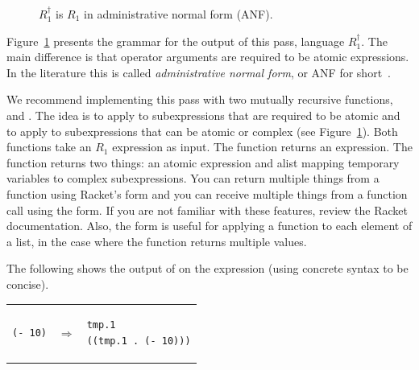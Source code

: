 \documentclass[11pt]{book}
\begin{document}
\begin{figure}[tp]
\centering
{}
\caption{$R_1^{\dagger}$ is $R_1$ in administrative normal form (ANF).}
\label{fig:r1-anf-syntax}
\end{figure}

Figure~\ref{fig:r1-anf-syntax} presents the grammar for the output of
this pass, language $R_1^{\dagger}$. The main difference is that
operator arguments are required to be atomic expressions.  In the
literature this is called \emph{administrative normal form}, or ANF
for short~\citep{Danvy:1991fk,Flanagan:1993cg}.

We recommend implementing this pass with two mutually recursive
functions,  and . The idea is to apply
 to subexpressions that are required to be atomic and
to apply  to subexpressions that can be atomic or
complex (see Figure~\ref{fig:r1-anf-syntax}).  Both functions take an
$R_1$ expression as input.  The  function returns an
expression.  The  function returns two things: an
atomic expression and alist mapping temporary variables to complex
subexpressions. You can return multiple things from a function using
Racket's  form and you can receive multiple things from a
function call using the  form. If you are not
familiar with these features, review the Racket documentation.  Also,
the \href{https://docs.racket-lang.org/reference/for.html#%28form._%28%28lib._racket%2Fprivate%2Fbase..rkt%29._for%2Flists%29%29}{\code{for/lists}}
form is useful for applying a function to each
element of a list, in the case where the function returns multiple
values.

The following shows the output of  on the expression
 (using concrete syntax to be concise).

\begin{tabular}{lll}
\begin{minipage}{0.4\textwidth}
\begin{lstlisting}
(- 10)
\end{lstlisting}
\end{minipage}
&
$\Rightarrow$
&
\begin{minipage}{0.4\textwidth}
\begin{lstlisting}
tmp.1
((tmp.1 . (- 10)))
\end{lstlisting}
\end{minipage}
\end{tabular}
\end{document}
